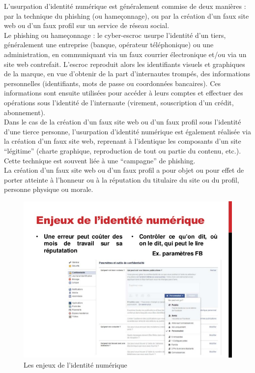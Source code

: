 \documentclass[12pt]{report}
\begin{document}
L’usurpation d’identité numérique est généralement commise de deux manières : par la technique du phishing (ou hameçonnage), ou par la création d’un faux site web ou d’un faux profil sur un service de réseau social. \\

Le phishing ou hameçonnage : le cyber-escroc usurpe l’identité d’un tiers, généralement une entreprise (banque, opérateur téléphonique) ou une administration, en communiquant via un faux courrier électronique et/ou via un site web contrefait. L’escroc reproduit alors les identifiants visuels et graphiques de la marque, en vue d’obtenir de la part d’internautes trompés, des informations personnelles (identifiants, mots de passe ou coordonnées bancaires). Ces informations sont ensuite utilisées pour accéder à leurs comptes et effectuer des opérations sous l’identité de l’internaute (virement, souscription d’un crédit, abonnement).\\

Dans le cas de la création d’un faux site web ou d’un faux profil sous l’identité d’une tierce personne, l’usurpation d’identité numérique est également réalisée via la création d’un faux site web, reprenant à l’identique les composants d’un site “légitime” (charte graphique, reproduction de tout ou partie du contenu, etc.). Cette technique est souvent liée à une “campagne” de phishing.\\

La création d’un faux site web ou d’un faux profil a pour objet ou pour effet de porter atteinte à l’honneur ou à la réputation du titulaire du site ou du profil, personne physique ou morale. \\

\begin{figure}[h]
    \includegraphics[width=150mm]{EnjeuxIdentiteNumerique.jpg}
    \caption{Les enjeux de l'identité numérique}
\label{fig:Les enjeux de l'identité numérique}
  \end{figure}
\end{document}
